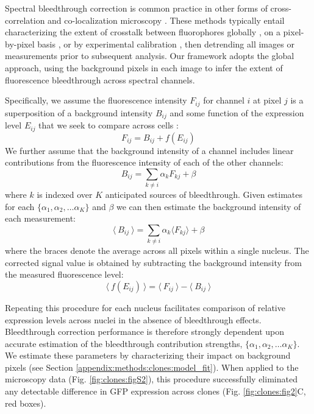 Spectral bleedthrough correction is common practice in other forms of cross-correlation and co-localization microscopy \cite{Bacia2012,Zinchuk2007}. These methods typically entail characterizing the extent of crosstalk between fluorophores globally \cite{Arsenovic2017,Kim2013}, on a pixel-by-pixel basis \cite{Elangovan2003}, or by experimental calibration \cite{Bacia2012}, then detrending all images or measurements prior to subsequent analysis. Our framework adopts the global approach, using the background pixels in each image to infer the extent of fluorescence bleedthrough across spectral channels.

Specifically, we assume the fluorescence intensity $F_{ij}$ for channel $i$ at pixel $j$ is a superposition of a background intensity $B_{ij}$ and some function of the expression level $E_{ij}$ that we seek to compare across cells \cite{McMullen2010}:
\begin{equation}
F_{ij} = B_{ij} + f(E_{ij})
\end{equation}
We further assume that the background intensity of a channel includes linear contributions from the fluorescence intensity of each of the other channels:
\begin{equation}
B_{ij} = \sum_{k \neq i}{\alpha_k F_{kj}} + \beta
\end{equation}
where $k$ is indexed over $K$ anticipated sources of bleedthrough. Given estimates for each $\{\alpha_1, \alpha_2, \ldots \alpha_K\}$ and $\beta$ we can then estimate the background intensity of each measurement:
\begin{equation} \label{eq:clones:bg_model}
\langle\ B_{ij}\ \rangle = \sum_{k \neq i}{\alpha_k \langle F_{kj} \rangle} + \beta
\end{equation}
where the braces denote the average across all pixels within a single nucleus. The corrected signal value is obtained by subtracting the background intensity from the measured fluorescence level:
\begin{equation}
\langle\ f(E_{ij}) \ \rangle = \langle\ F_{ij}\ \rangle - \langle\ B_{ij}\ \rangle
\end{equation}

Repeating this procedure for each nucleus facilitates comparison of relative expression levels across nuclei in the absence of bleedthrough effects. Bleedthrough correction performance is therefore strongly dependent upon accurate estimation of the bleedthrough contribution strengths, $\{\alpha_1, \alpha_2, \ldots \alpha_K\}$. We estimate these parameters by characterizing their impact on background pixels (see Section \ref{appendix:methods:clones:model_fit}). When applied to the microscopy data (Fig. \ref{fig:clones:figS2}), this procedure successfully eliminated any detectable difference in GFP expression across clones (Fig. \ref{fig:clones:fig2}C, red boxes).

